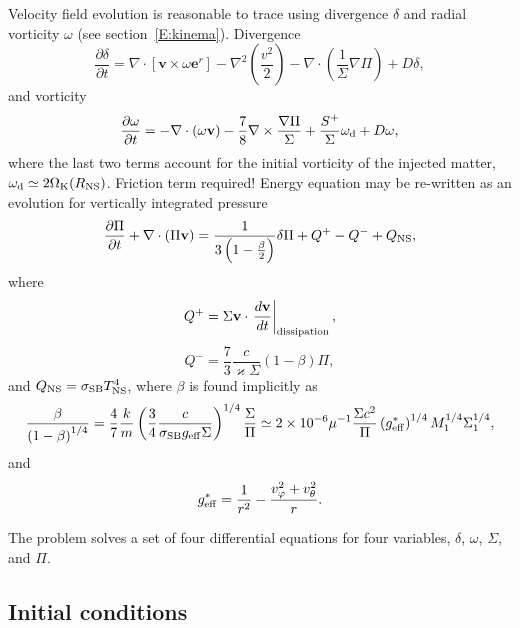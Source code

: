 \documentclass[usenatbib,onecolumn]{mnras}
\newcommand{\alert}[1]{\color{red} #1\color{black}}
\renewcommand{\vector}[1]{\ensuremath{\mathbf{#1}}}
\newcommand{\pardir}[2]{\ensuremath{\frac{\partial #2}{\partial #1} }}
\begin{document}
Velocity field evolution is reasonable to trace using divergence $\delta$ and
radial vorticity $\omega$ (see section~\ref{E:kinema}). Divergence
\begin{equation}\label{E:set:div}
\pardir{t}{\delta} = \nabla \cdot [\vector{v} \times  \omega \vector{e}^r] -
\nabla^2 \left(\frac{v^2}{2}\right) - \nabla \cdot \left( \frac{1}{\Sigma}
\nabla \Pi \right) + D\delta,
\end{equation}
and vorticity
\begin{equation}\label{E:set:vort}
\pardir{t}{\omega} = -\nabla \cdot (\omega \vector{v}) -
\frac{7}{8}\nabla \times \frac{\nabla \Pi}{\Sigma}+
\frac{S^+}{\Sigma} \omega_{\rm d} + D\omega,
\end{equation}
where the last two terms account for the initial vorticity of the injected
matter, $\omega_{\rm d} \simeq 2\Omega_{\rm K}(R_{\rm NS})$. \alert{Friction
  term required!}
Energy equation may be re-written as an evolution for vertically integrated
pressure
\begin{equation}\label{E:set:press}
\pardir{t}{\Pi} + \nabla \cdot \left( \Pi \vector{v}\right) = \frac{1}{3\left(
  1-\frac{\beta}{2}\right)} \delta \Pi + Q^+ - Q^- + Q_{\rm NS},
\end{equation}
where 
\begin{equation}\label{E:set:qplus}
Q^+ = \Sigma \vector{v} \cdot \left.\frac{d\vector{v}}{dt}\right|_{\rm dissipation},
\end{equation}
\begin{equation}\label{E:set:qminus}
Q^- = \frac{7}{3} \frac{c}{\varkappa \Sigma}(1-\beta) \Pi,
\end{equation}
and $Q_{\rm NS} =  \sigma_{\rm SB} T_{\rm NS}^4$, where $\beta$ is found
implicitly as
\begin{equation}\label{E:set:beta}
\frac{\beta}{\left(1-\beta\right)^{1/4}} = \frac{4}{7} \frac{k}{m}
\left(\frac{3}{4}\frac{c}{\sigma_{\rm SB} g_{\rm eff} \Sigma} \right)^{1/4}
\frac{\Sigma}{\Pi} \simeq 2\times 10^{-6} \mu^{-1} \frac{\Sigma c^2}{\Pi}
\left(g_{\rm eff}^*\right)^{1/4} M_1^{1/4} \Sigma_1^{1/4},
\end{equation}
and 
\begin{equation}\label{E:set:gravity}
g_{\rm eff}^* = \frac{1}{r^2} - \frac{v_\varphi^2 + v_\theta^2}{r}.
\end{equation}

The problem solves a set of four differential equations for four variables,
$\delta$, $\omega$, $\Sigma$, and $\Pi$.

\subsection{Initial conditions}
\end{document}
